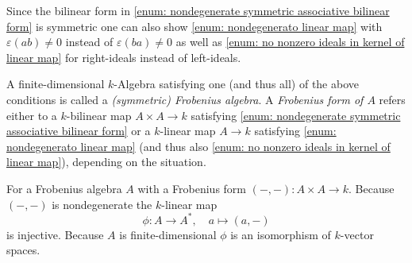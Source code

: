 \begin{rem}
  Since the bilinear form in \ref{enum: nondegenerate symmetric associative bilinear form} is symmetric one can also show \ref{enum: nondegenerato linear map} with $\varepsilon(ab) \neq 0$ instead of $\varepsilon(ba) \neq 0$ as well as \ref{enum: no nonzero ideals in kernel of linear map} for right-ideals instead of left-ideals.
\end{rem}


\begin{defi}
  A finite-dimensional $k$-Algebra satisfying one (and thus all) of the above conditions is called a \emph{(symmetric) Frobenius algebra}.
  A \emph{Frobenius form of $A$} refers either to a $k$-bilinear map $A \times A \to k$ satisfying \ref{enum: nondegenerate symmetric associative bilinear form} or a $k$-linear map $A \to k$ satisfying \ref{enum: nondegenerato linear map} (and thus also \ref{enum: no nonzero ideals in kernel of linear map}), depending on the situation.
\end{defi}


\begin{rem}
  For a Frobenius algebra $A$ with a Frobenius form $(-,-) \colon A \times A \to k$.
  Because $(-,-)$ is nondegenerate the $k$-linear map
  \[
            \phi
    \colon  A
    \to     A^*,
    \quad   a
    \mapsto (a,-)
  \]
  is injective.
  Because $A$ is finite-dimensional $\phi$ is an isomorphism of $k$-vector spaces.
\end{rem}


